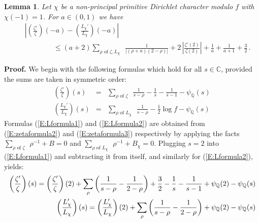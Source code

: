 \documentclass{amsart}
\newtheorem{lemma}[theorem]{Lemma}
\numberwithin{equation}{section}
\numberwithin{table}{section}
\begin{document}
\begin{lemma}\label{L:q2lemma2}
Let $\chi$ be a non-principal primitive Dirichlet character modulo $f$ with \mbox{$\chi(-1)=1$}.
For $a\in(0,1)$ we have
\begin{eqnarray*}
   &&
    \left|
  \left(\frac{\zeta'}{\zeta}\right)(-a)
  -
  \left(\frac{L_{\chi}'}{L_{\chi}}\right)(-a)
  \right|
  \\[1ex]
  &&
  \qquad\qquad
  \leq
  (a+2)
   \sum_{\rho\text{ of $\zeta,L_\chi$ }}
  
  
  \frac{1}{|(\rho+a)(2-\rho)|}
  +
  2\,
  \left|\frac{\zeta'(2)}{\zeta(2)}\right|
  +
  \frac{1}{a}
  +
  \frac{1}{a+1}
  +
  \frac{3}{2}
  \,.
\end{eqnarray*} 
\end{lemma}

\noindent\textbf{Proof.}
We begin with the following formulas which hold for all $s\in{\mathbb{C}}$, provided the sums are taken in symmetric order:
\begin{eqnarray}
  \label{E:Lformula1}
  \left(\frac{\zeta'}{\zeta}\right)(s)
  &=&
  
   \sum_{\rho\text{ of $\zeta$ }}
  \frac{1}{s-\rho}
  -\frac{1}{s}
  -\frac{1}{s-1}
  -\psi_{\mathbb{Q}}(s)
  \\
  \label{E:Lformula2}
  \left(\frac{L_\chi'}{L_\chi}\right)(s)
  &=&
  
   \sum_{\rho\text{ of $L_\chi$ }}
  \frac{1}{s-\rho}
  -\frac{1}{2}\log f
  -\psi_{\mathbb{Q}}(s)
\end{eqnarray}
Formulas (\ref{E:Lformula1}) and (\ref{E:Lformula2}) are obtained from
(\ref{E:zetaformula2}) and (\ref{E:zetaformula3}) respectively by applying the facts
$\sum_{\rho\text{ of $\zeta$ }}\rho^{-1}+B=0$ and $\sum_{\rho\text{ of $L_\chi$ }}\rho^{-1}+B_\chi=0$.
Plugging $s=2$ into (\ref{E:Lformula1}) and subtracting it from itself, and similarly for (\ref{E:Lformula2}), yields:
\begin{eqnarray*}
&&
\hspace{-2ex}
  \left(\frac{\zeta'}{\zeta}\right)(s)
  
  
  =
  
  \left(\frac{\zeta'}{\zeta}\right)(2)
  +
  \sum_\rho
  \left(\frac{1}{s-\rho}-\frac{1}{2-\rho}\right)
  +\frac{3}{2}
  -\frac{1}{s}
  -\frac{1}{s-1}
  +
  
  \psi_{\mathbb{Q}}(2)-\psi_{\mathbb{Q}}(s)
  \\
  &&
  \hspace{-2.75ex}
  \left(\frac{L_\chi'}{L_\chi}\right)(s)
=
  \left(\frac{L_\chi'}{L_\chi}\right)(2)
  +
  \sum_\rho
    \left(\frac{1}{s-\rho}-\frac{1}{2-\rho}\right)
  +
  
    \psi_{\mathbb{Q}}(2)-\psi_{\mathbb{Q}}(s)
\end{eqnarray*}
\end{document}
